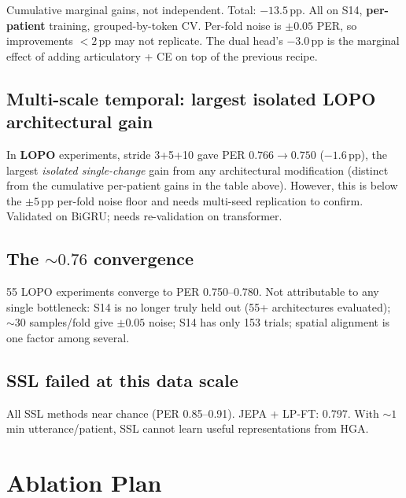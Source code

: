 \documentclass[11pt,letterpaper]{article}
\newcommand{\pp}{\,\text{pp}}
\begin{document}
Cumulative marginal gains, not independent. Total: $-13.5\pp$. All on S14, \textbf{per-patient} training, grouped-by-token CV. Per-fold noise is $\pm 0.05$ PER, so improvements $< 2\pp$ may not replicate. The dual head's $-3.0\pp$ is the marginal effect of adding articulatory + CE on top of the previous recipe.

\subsection{Multi-scale temporal: largest isolated LOPO architectural gain}

In \textbf{LOPO} experiments, stride 3+5+10 gave PER $0.766 \to 0.750$ ($-1.6\pp$), the largest \textit{isolated single-change} gain from any architectural modification (distinct from the cumulative per-patient gains in the table above). However, this is below the $\pm 5\pp$ per-fold noise floor and needs multi-seed replication to confirm. Validated on BiGRU; needs re-validation on transformer.

\subsection{The ${\sim}0.76$ convergence}

55 LOPO experiments converge to PER 0.750--0.780. Not attributable to any single bottleneck: S14 is no longer truly held out (55+ architectures evaluated); ${\sim}30$ samples/fold give $\pm 0.05$ noise; S14 has only 153 trials; spatial alignment is one factor among several.

\subsection{SSL failed at this data scale}

All SSL methods near chance (PER 0.85--0.91). JEPA + LP-FT: 0.797. With ${\sim}1$\,min utterance/patient, SSL cannot learn useful representations from HGA.



\section{Ablation Plan}\label{sec:ablations}
\end{document}
